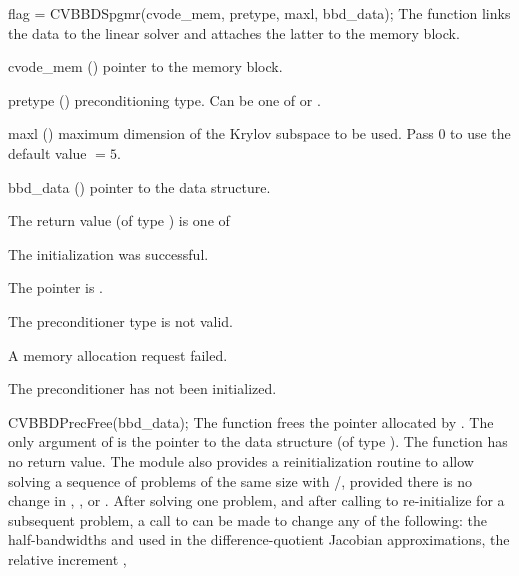 {
  flag = CVBBDSpgmr(cvode\_mem, pretype, maxl, bbd\_data);
}
{
  The function  links the {\cvbbdpre} data to the
  {\cvspgmr} linear solver and attaches the latter to the {\cvode}
  memory block.
}
{
  \begin{args}
  \item[cvode\_mem] ()
    pointer to the {\cvode} memory block.
  \item[pretype] ()
    preconditioning type. Can be one of  or .
  \item[maxl] ()
    maximum dimension of the Krylov subspace to be used. Pass $0$ to use the 
    default value $=5$.
  \item[bbd\_data] ()
    pointer to the {\cvbbdpre} data structure.
  \end{args}
}
{
  The return value  (of type ) is one of
  \begin{args}
  \item[\Id{SUCCESS}] 
    The {\cvspgmr} initialization was successful.
  \item[\Id{LIN\_NO\_MEM}]
    The  pointer is .
  \item[\Id{LIN\_ILL\_INPUT}]
    The preconditioner type  is not valid.
  \item[\Id{LMEM\_FAIL}]
    A memory allocation request failed.
  \item[\Id{BBDP\_NO\_DATA}]
    The {\cvbbdpre} preconditioner has not been initialized.
  \end{args}
}
{}
{
  CVBBDPrecFree(bbd\_data);
}
{
  The function  frees the pointer allocated by
  .
}
{
  The only argument of  is the pointer to the {\cvbbdpre} 
  data structure (of type ).
}
{
  The function  has no return value.
}
{}
The {\cvbbdpre} module also provides a reinitialization routine to allow
solving  a sequence of problems of the same size with {\cvspgmr}/{\cvbbdpre},
provided there is no change in , , or .
After solving one problem, and after calling  to re-initialize 
{\cvode} for a subsequent problem, a call to  can be made
to change any of the following: the half-bandwidths  and  
used in the difference-quotient Jacobian approximations, the relative increment , 
